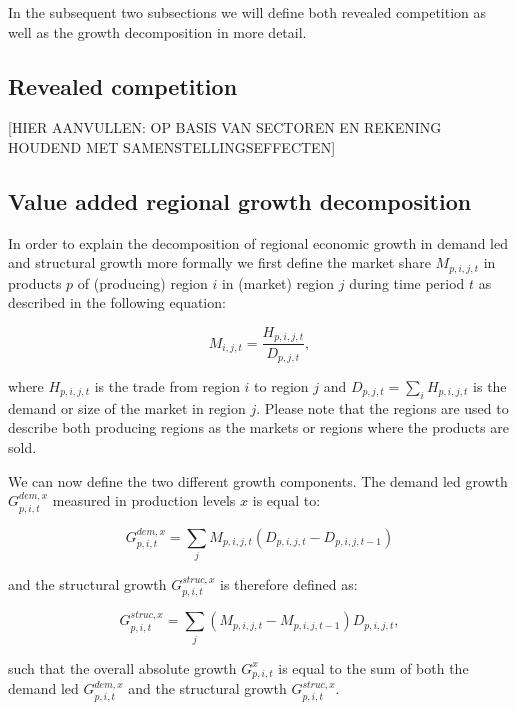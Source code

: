 \documentclass[11pt,parskip,abstracton,notitlepage, paper=a4]{scrartcl}
\begin{document}
In the subsequent two subsections we will define both revealed competition as well as the growth decomposition in more detail.

\subsection{Revealed competition}

[HIER AANVULLEN: OP BASIS VAN SECTOREN EN REKENING HOUDEND MET SAMENSTELLINGSEFFECTEN]

\subsection{Value added regional growth decomposition}

In order to explain the decomposition of regional economic growth in demand led and structural growth more formally we first define the market share $M_{p,i,j,t}$  in products $p$ of (producing) region $i$ in (market) region $j$ during time period $t$ as described in the following equation:

\begin{equation}
M_{i,j,t} = \frac{H_{p,i,j,t}}{D_{p,j,t}},
\label{eq:Mijt}
\end{equation}

where $H_{p,i,j,t}$  is the trade from region $i$ to region $j$ and $D_{p,j,t} = \sum_i{H_{p,i,j,t}}$  is the demand or size of the market in region $j$. Please note that the regions are used to describe both producing regions as the markets or regions where the products are sold.

We can now define the two different growth components. The demand led growth $G_{p,i,t}^{dem,x}$  measured in production levels $x$  is equal to:

\begin{equation}
G_{p,i,t}^{dem,x} = \sum_j {M_{p,i,j,t} \left(D_{p,i,j,t} - D_{p,i,j,t-1} \right) }
\label{eq:Gdem}
\end{equation}

and the structural growth $G_{p,i,t}^{struc,x}$ is therefore defined as:

\begin{equation}
G_{p,i,t}^{struc,x} = \sum_j {\left(M_{p,i,j,t} - M_{p,i,j,t-1} \right)D_{p,i,j,t} },
\label{eq:struc}
\end{equation}

such that the overall absolute growth $G_{p,i,t}^{x}$ is equal to the sum of both the demand led $G_{p,i,t}^{dem,x}$ and the structural growth $G_{p,i,t}^{struc,x}$.
\end{document}
